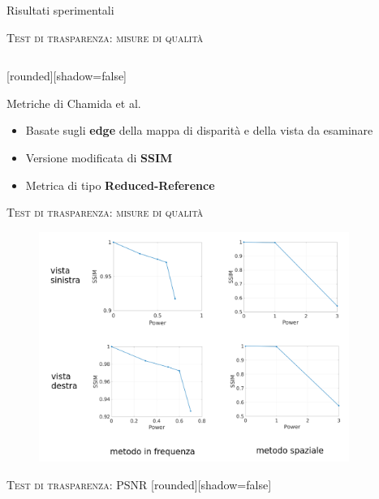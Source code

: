 \documentclass{beamer}
\begin{document}
\begin{section}{Risultati sperimentali}
\begin{frame}[t]{\textsc{Test di trasparenza: misure di qualit\`{a} }}
\begin{columns}
\end{columns}
\vspace{-7mm}
[rounded][shadow=false]

\begin{block}{\small Metriche di Chamida et al.}
\begin{itemize}
\item \small Basate sugli \textbf{edge} della mappa di disparit\`{a} e della vista da esaminare
\item \small Versione modificata di \textbf{SSIM} 
\item \small Metrica di tipo \textbf{Reduced-Reference} 
\end{itemize}
\end{block}
\end{frame}


\begin{frame}[t]{\textsc{Test di trasparenza: misure di qualit\`{a} }}
\vspace{-3mm}
\begin{figure}
  \includegraphics[width=0.9\textwidth]{./img_wat/qm_res.png}  
  \caption{} 
  \label{fig:qmgr}
\end{figure}


\end{frame}

\begin{frame}[t]{\textsc{Test di trasparenza: PSNR}}
[rounded][shadow=false]
\begin{block}{}


\end{block}
\end{frame}
\end{section}
\end{document}
